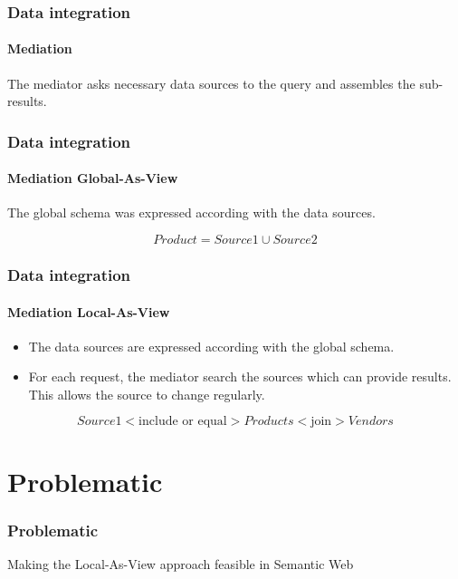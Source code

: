 \documentclass{beamer}
\begin{document}
\begin{frame}
\frametitle{Data integration}
\framesubtitle{Mediation}
\begin{center}
The mediator asks necessary data sources to the query and assembles the sub-results.
\end{center}
\end{frame}

\begin{frame}
\frametitle{Data integration}
\framesubtitle{Mediation Global-As-View}
\begin{center}
The global schema was expressed according with the data sources.
\begin{example}
\begin{equation}
Product = Source 1 \cup Source 2
\end{equation}
\end{example}
\end{center}
\end{frame}

\begin{frame}
\frametitle{Data integration}
\framesubtitle{Mediation Local-As-View}
\begin{center}
\begin{itemize}
\item The data sources are expressed according with the global schema.
\item For each request, the mediator search the sources which can provide results. This allows the source to change regularly.
\end{itemize}
\begin{example}
\begin{equation}
Source 1 <\text{include or equal}> Products <\text{join}> Vendors
\end{equation}
\end{example}
\end{center}
\end{frame}

\section{Problematic}
\begin{frame}
\frametitle{Problematic}
\begin{center}
Making the Local-As-View approach feasible in Semantic Web
\end{center}
\end{frame}
\end{document}
